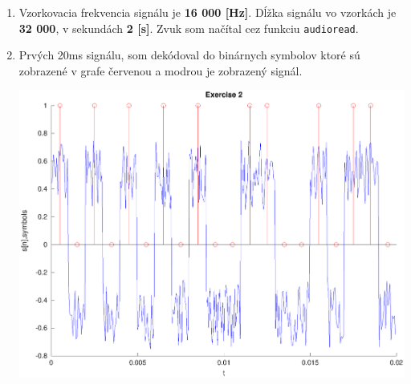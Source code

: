 \documentclass[11pt, a4paper,twocolumn]{article}
\begin{document}
\begin{enumerate}
    \item
    {
        Vzorkovacia frekvencia signálu je \textbf{16 000 [Hz]}. Dĺžka signálu vo vzorkách je \textbf{32 000}, v sekundách \textbf{2 [s]}. Zvuk som načítal cez funkciu \texttt{audioread}.
    }

    \item
    {
        Prvých 20ms signálu, som dekódoval do binárnych symbolov ktoré sú zobrazené v grafe červenou a modrou je zobrazený signál.
        \begin{center}
        \includegraphics[width=\linewidth,keepaspectratio]{include/2.eps}
        \end{center}
    }


\end{enumerate}
\end{document}
